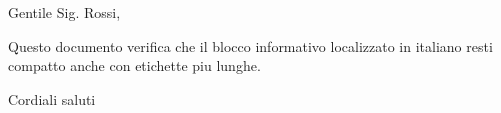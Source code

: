 \documentclass[basic, infoblock, lang=italian]{../../onlinebrief24}
\begin{document}
\begin{letter}{}
\opening{Gentile Sig. Rossi,}

Questo documento verifica che il blocco informativo localizzato in italiano
resti compatto anche con etichette piu lunghe.

\closing{Cordiali saluti}
\end{letter}
\end{document}

